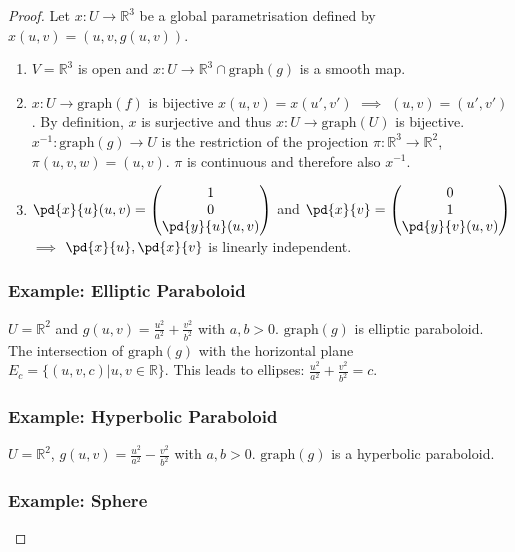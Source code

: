 \begin{proof}

Let $x : U \rightarrow \mathbb{R}^3$ be a global parametrisation defined by $x(u,v) = (u,v,g(u,v))$.
\begin{enumerate}
\item $V = \mathbb{R}^3$ is open and $x: U \rightarrow \mathbb{R}^3 \cap \text{graph}(g)$ is a smooth map.
\item $x : U \rightarrow \text{graph}(f)$ is bijective $x(u,v) = x(u',v')$ $\implies$ $(u,v) = (u',v')$. By definition, $x$ is surjective and thus $x : U \rightarrow \text{graph}(U)$ is bijective. $x^{-1} : \text{graph}(g) \rightarrow U$ is the restriction of the projection $\pi: \mathbb{R}^3 \rightarrow \mathbb{R}^2$, $\pi(u,v,w) = (u,v)$. $\pi$ is continuous and therefore also $x^{-1}$.
\item $\displaystyle \pd{x}{u} (u,v) = \begin{pmatrix} 1 \\ 0 \\ \pd{y}{u}(u,v) \end{pmatrix}$ and $\displaystyle \pd{x}{v} = \begin{pmatrix} 0 \\ 1 \\ \pd{y}{v} (u,v) \end{pmatrix}$ $\implies$ $\pd{x}{u}, \pd{x}{v}$ is linearly independent.
\end{enumerate}

\subsubsection*{Example: Elliptic Paraboloid}

$U = \mathbb{R}^2$ and $g(u,v) = \frac{u^2}{a^2} + \frac{v^2}{b^2}$ with $a,b > 0$. $\text{graph}(g)$ is elliptic paraboloid. The intersection of $\text{graph}(g)$ with the horizontal plane $E_c = \{ (u,v,c) | u,v\in \mathbb{R}\}$. This leads to ellipses: $\frac{u^2}{a^2} + \frac{v^2}{b^2} = c$.

\subsubsection*{Example: Hyperbolic Paraboloid}

$U = \mathbb{R}^2$, $g(u,v) = \frac{u^2}{a^2} - \frac{v^2}{b^2}$ with $a,b>0$. $\text{graph}(g)$ is a hyperbolic paraboloid.

\subsubsection*{Example: Sphere}


\end{proof}
